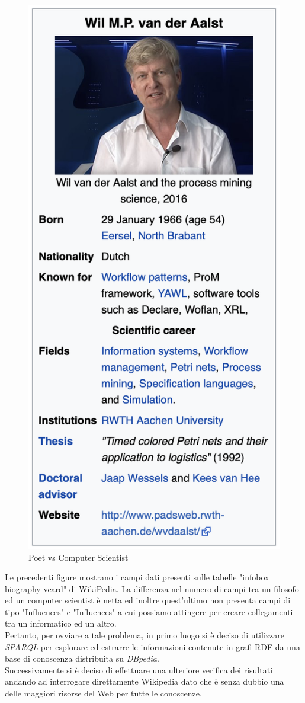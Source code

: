 \documentclass[12pt, twoside]{article}
\begin{document}
\begin{figure}[htp]
\begin{minipage}[t]{0.5\linewidth}
\includegraphics[width = .5\textwidth]{images/van_der}
\end{minipage}
\caption{Poet vs Computer Scientist}
\end{figure}
\noindent
Le precedenti figure mostrano i campi dati presenti sulle tabelle "infobox biography vcard" di WikiPedia. La differenza nel numero di campi tra un filosofo ed un computer scientist è netta ed inoltre quest'ultimo non presenta campi di tipo "Influences" e "Influences" a cui possiamo attingere per creare collegamenti tra un informatico ed un altro.\\
Pertanto, per ovviare a tale problema, in primo luogo si è deciso di utilizzare \textit{SPARQL} per esplorare ed estrarre le informazioni contenute in grafi RDF da una base di conoscenza distribuita su \textit{DBpedia}.\\
Successivamente si è deciso di effettuare una ulteriore verifica dei risultati andando ad interrogare direttamente Wikipedia dato che è senza dubbio una delle maggiori risorse del Web per tutte le conoscenze.

\newpage
\end{document}
